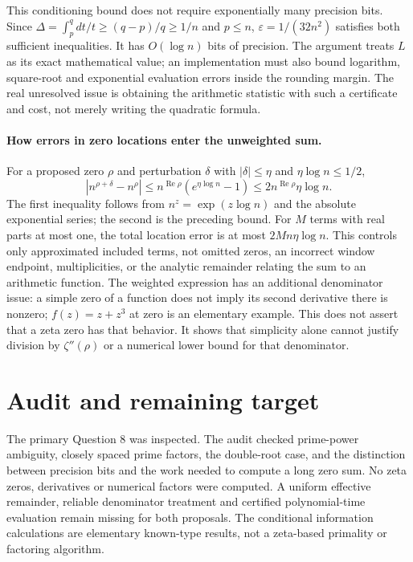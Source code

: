\documentclass[11pt]{article}
\begin{document}
This conditioning bound does not require exponentially many precision
bits. Since
$\Delta=\int_p^q dt/t\ge(q-p)/q\ge1/n$ and $p\le n$,
$\varepsilon=1/(32n^2)$ satisfies both sufficient inequalities.
It has $O(\log n)$ bits of precision. The argument treats $L$ as its
exact mathematical value; an implementation must also bound logarithm,
square-root and exponential evaluation errors inside the rounding
margin. The real unresolved issue is obtaining the arithmetic statistic
with such a certificate and cost, not merely writing the quadratic
formula.

\paragraph{How errors in zero locations enter the unweighted sum.}
For a proposed zero $\rho$ and perturbation $\delta$ with
$|\delta|\le\eta$ and $\eta\log n\le1/2$,
\[
|n^{\rho+\delta}-n^\rho|
\le n^{\operatorname{Re}\rho}(e^{\eta\log n}-1)
\le2n^{\operatorname{Re}\rho}\eta\log n.
\]
The first inequality follows from $n^z=\exp(z\log n)$ and the
absolute exponential series; the second is the preceding bound.
For $M$ terms with real parts at most one, the total location error is
at most $2Mn\eta\log n$. This controls only approximated included
terms, not omitted zeros, an incorrect window endpoint, multiplicities,
or the analytic remainder relating the sum to an arithmetic function.
The weighted expression has an additional denominator issue:
a simple zero of a function does not imply its second derivative there
is nonzero; $f(z)=z+z^3$ at zero is an elementary example.
This does not assert that a zeta zero has that behavior. It shows that
simplicity alone cannot justify division by $\zeta''(\rho)$ or a
numerical lower bound for that denominator.

\section{Audit and remaining target}
The primary Question 8 was inspected. The audit checked prime-power
ambiguity, closely spaced prime factors, the double-root case, and the
distinction between precision bits and the work needed to compute a
long zero sum. No zeta zeros, derivatives or numerical factors were
computed. A uniform effective remainder, reliable denominator treatment
and certified polynomial-time evaluation remain missing for both
proposals. The conditional information calculations are elementary
known-type results, not a zeta-based primality or factoring algorithm.
\end{document}
